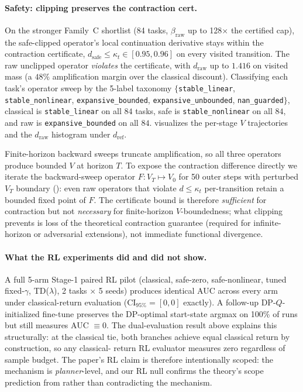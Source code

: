 \paragraph{Safety: clipping preserves the contraction cert.}
On the stronger Family~C shortlist (84 tasks, $\beta_\mathrm{raw}$ up to
128$\times$ the certified cap), the safe-clipped operator's local
continuation derivative stays within the contraction certificate,
$d_\mathrm{safe} \leq \kappa_t \in [0.95, 0.96]$ on every visited
transition. The raw unclipped operator \emph{violates} the certificate,
with $d_\mathrm{raw}$ up to $1.416$ on visited mass (a $48\%$
amplification margin over the classical discount). Classifying each
task's operator sweep by the 5-label taxonomy $\{$\texttt{stable\_linear},
\texttt{stable\_nonlinear}, \texttt{expansive\_bounded},
\texttt{expansive\_unbounded}, \texttt{nan\_guarded}$\}$, classical is
\texttt{stable\_linear} on all $84$ tasks, safe is \texttt{stable\_nonlinear}
on all $84$, and raw is \texttt{expansive\_bounded} on all $84$.
 visualizes the per-stage $V$
trajectories and the $d_\mathrm{raw}$ histogram under $d_\mathrm{ref}$.

Finite-horizon backward sweeps truncate amplification, so all three
operators produce bounded $V$ at horizon $T$. To expose the contraction
difference directly we iterate the backward-sweep operator $F\colon
V_T \mapsto V_0$ for 50 outer steps with perturbed $V_T$ boundary
(): even raw operators that violate
$d \leq \kappa_t$ per-transition retain a bounded fixed point of $F$.
The certificate bound is therefore \emph{sufficient} for contraction
but not \emph{necessary} for finite-horizon $V$-boundedness; what
clipping prevents is loss of the theoretical contraction guarantee
(required for infinite-horizon or adversarial extensions), not immediate
functional divergence.

\paragraph{What the RL experiments did and did not show.}
A full 5-arm Stage-1 paired RL pilot (classical, safe-zero,
safe-nonlinear, tuned fixed-$\gamma$, TD($\lambda$), 2 tasks $\times$ 5
seeds) produces identical AUC across every arm under classical-return
evaluation ($\mathrm{CI}_{95\%} = [0, 0]$ exactly). A follow-up
DP-$Q$-initialized fine-tune preserves the DP-optimal start-state argmax
on 100\% of runs but still measures AUC $\equiv 0$. The dual-evaluation
result above explains this structurally: at the classical tie, both
branches achieve equal classical return by construction, so any classical-
return RL evaluator measures zero regardless of sample budget. The
paper's RL claim is therefore intentionally scoped: the mechanism is
\emph{planner}-level, and our RL null confirms the theory's scope
prediction from  rather than contradicting
the mechanism.

